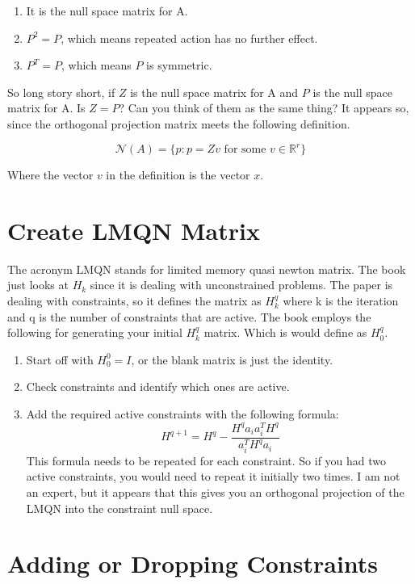 \documentclass{article}
\begin{document}
\begin{enumerate}
    \item It is the null space matrix for A.
    \item $P^{2} = P$, which means repeated action has no further effect.
    \item $P^{T} = P$, which means $P$ is symmetric.
\end{enumerate}

So long story short, if $Z$ is the null space matrix for A and $P$ is the null space matrix for A. Is $Z = P$? Can you think of them as the same thing? It appears so, since the orthogonal projection matrix meets the following definition.

$$\mathcal{N}(A) = \{p : p = Zv \text{ for some } v \in \mathbb{R}^r \}$$

Where the vector $v$ in the definition is the vector $x$.

\section{Create LMQN Matrix}

The acronym LMQN stands for limited memory quasi newton matrix. The book just looks at $H_{k}$ since it is dealing with unconstrained problems. The paper is dealing with constraints, so it defines the matrix as $H_{k}^{q}$ where k is the iteration and q is the number of constraints that are active. The book employs the following for generating your initial $H_k^{q}$ matrix. Which is would define as $H_0^q$.

\begin{enumerate}
    \item Start off with $H_0^0 = I$, or the blank matrix is just the identity.
    \item Check constraints and identify which ones are active.
    \item Add the required active constraints with the following formula:
    \begin{equation*}
        H^{q+1} = H^q - \dfrac{H^q a_{i} a_i^T H^q}{a_i^T H^q a_i}
    \end{equation*}
    This formula needs to be repeated for each constraint. So if you had two active constraints, you would need to repeat it initially two times. I am not an expert, but it appears that this gives you an orthogonal projection of the LMQN into the constraint null space. 
\end{enumerate}

\section{Adding or Dropping Constraints}
\end{document}
